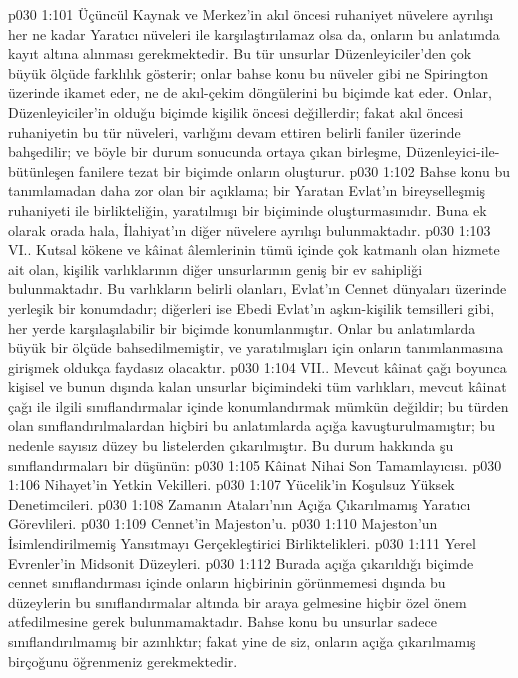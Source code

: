 \vs p030 1:101 Üçüncül Kaynak ve Merkez’in akıl öncesi ruhaniyet nüvelere ayrılışı her ne kadar Yaratıcı nüveleri ile karşılaştırılamaz olsa da, onların bu anlatımda kayıt altına alınması gerekmektedir. Bu tür unsurlar Düzenleyiciler’den çok büyük ölçüde farklılık gösterir; onlar bahse konu bu nüveler gibi ne Spirington üzerinde ikamet eder, ne de akıl\hyp{}çekim döngülerini bu biçimde kat eder. Onlar, Düzenleyiciler’in olduğu biçimde kişilik öncesi değillerdir; fakat akıl öncesi ruhaniyetin bu tür nüveleri, varlığını devam ettiren belirli faniler üzerinde bahşedilir; ve böyle bir durum sonucunda ortaya çıkan birleşme, Düzenleyici\hyp{}ile\hyp{}bütünleşen fanilere tezat bir biçimde onların  oluşturur.
\vs p030 1:102 Bahse konu bu tanımlamadan daha zor olan bir açıklama; bir Yaratan Evlat’ın bireyselleşmiş ruhaniyeti ile birlikteliğin, yaratılmışı bir  biçiminde oluşturmasınıdır. Buna ek olarak orada hala, İlahiyat’ın diğer nüvelere ayrılışı bulunmaktadır.
\vs p030 1:103 VI.. Kutsal kökene ve kâinat âlemlerinin tümü içinde çok katmanlı olan hizmete ait olan, kişilik varlıklarının diğer unsurlarının geniş bir ev sahipliği bulunmaktadır. Bu varlıkların belirli olanları, Evlat’ın Cennet dünyaları üzerinde yerleşik bir konumdadır; diğerleri ise Ebedi Evlat’ın aşkın\hyp{}kişilik temsilleri gibi, her yerde karşılaşılabilir bir biçimde konumlanmıştır. Onlar bu anlatımlarda büyük bir ölçüde bahsedilmemiştir, ve  yaratılmışları için onların tanımlanmasına girişmek oldukça faydasız olacaktır.
\vs p030 1:104 VII.\bibnobreakspace {}. Mevcut kâinat çağı boyunca kişisel ve bunun dışında kalan unsurlar biçimindeki tüm varlıkları, mevcut kâinat çağı ile ilgili sınıflandırmalar içinde konumlandırmak mümkün değildir; bu türden olan sınıflandırılmalardan hiçbiri bu anlatımlarda açığa kavuşturulmamıştır; bu nedenle sayısız düzey bu listelerden çıkarılmıştır. Bu durum hakkında şu sınıflandırmaları bir düşünün:
\vs p030 1:105 Kâinat Nihai Son Tamamlayıcısı.
\vs p030 1:106 Nihayet’in Yetkin Vekilleri.
\vs p030 1:107 Yücelik’in Koşulsuz Yüksek Denetimcileri.
\vs p030 1:108 Zamanın Ataları’nın Açığa Çıkarılmamış Yaratıcı Görevlileri.
\vs p030 1:109 Cennet’in Majeston’u.
\vs p030 1:110 Majeston’un İsimlendirilmemiş Yansıtmayı Gerçekleştirici Birliktelikleri.
\vs p030 1:111 Yerel Evrenler’in Midsonit Düzeyleri.
\vs p030 1:112 Burada açığa çıkarıldığı biçimde cennet sınıflandırması içinde onların hiçbirinin görünmemesi dışında bu düzeylerin bu sınıflandırmalar altında bir araya gelmesine hiçbir özel önem atfedilmesine gerek bulunmamaktadır. Bahse konu bu unsurlar sadece sınıflandırılmamış bir azınlıktır; fakat yine de siz, onların açığa çıkarılmamış birçoğunu öğrenmeniz gerekmektedir.
